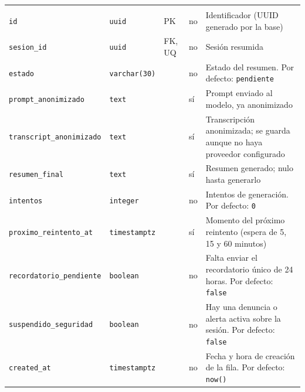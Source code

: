 {\small
\begin{xltabular}{\textwidth}{@{}>{\raggedright\arraybackslash}p{3.6cm} >{\raggedright\arraybackslash}p{2.3cm} >{\raggedright\arraybackslash}p{1cm} >{\centering\arraybackslash}p{0.85cm} L@{}}
    \toprule
     &  &  &  &  \\
    \midrule
    \endfirsthead
    \toprule
     &  &  &  &  \\
    \midrule
    \endhead
    \bottomrule
    \endfoot
    \texttt{id} & \texttt{uuid} & PK & no & Identificador (UUID generado por la base) \\
    \texttt{sesion\_\allowbreak{}id} & \texttt{uuid} & FK, UQ & no & Sesión resumida \\
    \texttt{estado} & \texttt{varchar(\allowbreak{}30)} &  & no & Estado del resumen. Por defecto: \texttt{\textquotesingle{}pendiente\textquotesingle{}} \\
    \texttt{prompt\_\allowbreak{}anonimizado} & \texttt{text} &  & sí & Prompt enviado al modelo, ya anonimizado \\
    \texttt{transcript\_\allowbreak{}anonimizado} & \texttt{text} &  & sí & Transcripción anonimizada; se guarda aunque no haya proveedor configurado \\
    \texttt{resumen\_\allowbreak{}final} & \texttt{text} &  & sí & Resumen generado; nulo hasta generarlo \\
    \texttt{intentos} & \texttt{integer} &  & no & Intentos de generación. Por defecto: \texttt{0} \\
    \texttt{proximo\_\allowbreak{}reintento\_\allowbreak{}at} & \texttt{timestamptz} &  & sí & Momento del próximo reintento (espera de 5, 15 y 60 minutos) \\
    \texttt{recordatorio\_\allowbreak{}pendiente} & \texttt{boolean} &  & no & Falta enviar el recordatorio único de 24 horas. Por defecto: \texttt{false} \\
    \texttt{suspendido\_\allowbreak{}seguridad} & \texttt{boolean} &  & no & Hay una denuncia o alerta activa sobre la sesión. Por defecto: \texttt{false} \\
    \texttt{created\_\allowbreak{}at} & \texttt{timestamptz} &  & no & Fecha y hora de creación de la fila. Por defecto: \texttt{now(\allowbreak{})} \\
\end{xltabular}
}

